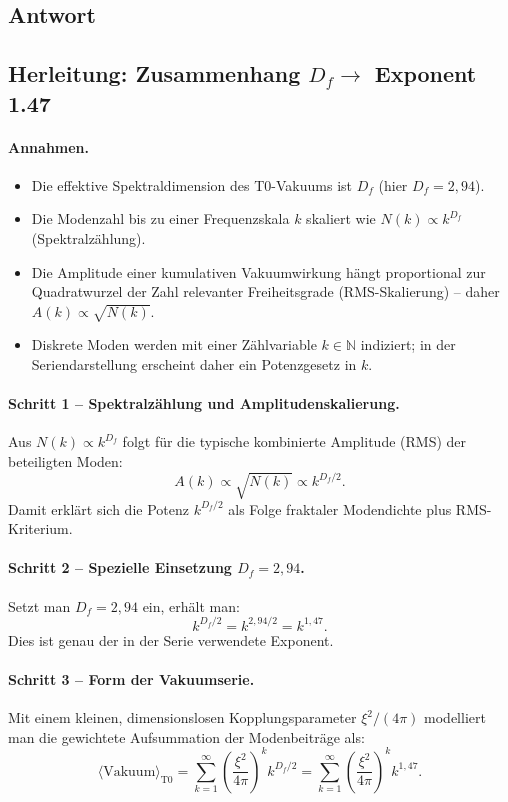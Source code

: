 \documentclass[12pt,a4paper]{article}
\theoremstyle{remark}
\newenvironment{answer}{\subsection*{Antwort}}{\vspace{1em}}
\begin{document}
\begin{answer}
\subsection{Herleitung: Zusammenhang $D_f \to$ Exponent 1.47}

\paragraph{Annahmen.}
\begin{itemize}
	\item Die effektive Spektraldimension des T0-Vakuums ist $D_f$ (hier $D_f = 2{,}94$).
	\item Die Modenzahl bis zu einer Frequenzskala $k$ skaliert wie $N(k) \propto k^{D_f}$ (Spektralzählung).
	\item Die Amplitude einer kumulativen Vakuumwirkung hängt proportional zur Quadratwurzel der Zahl relevanter Freiheitsgrade (RMS-Skalierung) -- daher $A(k) \propto \sqrt{N(k)}$.
	\item Diskrete Moden werden mit einer Zählvariable $k \in \mathbb{N}$ indiziert; in der Seriendarstellung erscheint daher ein Potenzgesetz in $k$.
\end{itemize}

\paragraph{Schritt 1 -- Spektralzählung und Amplitudenskalierung.}
Aus $N(k) \propto k^{D_f}$ folgt für die typische kombinierte Amplitude (RMS) der beteiligten Moden:
\begin{equation}
	A(k) \propto \sqrt{N(k)} \propto k^{D_f / 2}.
\end{equation}
Damit erklärt sich die Potenz $k^{D_f / 2}$ als Folge fraktaler Modendichte plus RMS-Kriterium.

\paragraph{Schritt 2 -- Spezielle Einsetzung $D_f = 2{,}94$.}
Setzt man $D_f = 2{,}94$ ein, erhält man:
\begin{equation}
	k^{D_f / 2} = k^{2{,}94 / 2} = k^{1{,}47}.
\end{equation}
Dies ist genau der in der Serie verwendete Exponent.

\paragraph{Schritt 3 -- Form der Vakuumserie.}
Mit einem kleinen, dimensionslosen Kopplungsparameter $\xi^2 / (4\pi)$ modelliert man die gewichtete Aufsummation der Modenbeiträge als:
\begin{equation}
	\langle \text{Vakuum} \rangle_{\text{T0}} = \sum_{k=1}^\infty \left( \frac{\xi^2}{4\pi} \right)^k k^{D_f / 2} = \sum_{k=1}^\infty \left( \frac{\xi^2}{4\pi} \right)^k k^{1{,}47}.
\end{equation}


\end{answer}
\end{document}

